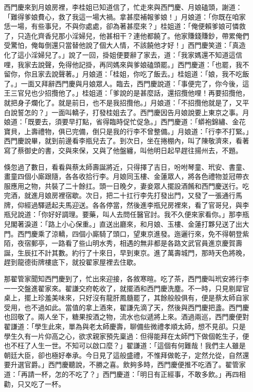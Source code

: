 西門慶來到月娘房裡，李桂姐已知道信了，忙走來與西門慶、月娘磕頭，謝道：「難得爹娘費心，救了我這一場大禍。拿甚麼補報爹娘！」月娘道：「你既在咱家恁一場，有些事兒，不與你處處，卻為著甚麼來？」桂姐道：「俺便賴爹娘可憐救了，只造化齊香兒那小淫婦兒，他甚相干？連他都饒了。他家賺錢賺鈔，帶累俺們受驚怕，俺每倒還只當替他說了個大人情，不該饒他才好！」西門慶笑道：「真造化了這小淫婦兒了。」說了一回，掛姐便要辭了家去，道：「我家媽還不知道這信哩，我家去說聲，免得他記掛，再同媽來與爹娘磕頭罷。」西門慶道：「也罷，我不留你，你且家去說聲著。」月娘道：「桂姐，你吃了飯去。」桂姐道：「娘，我不吃飯了。」一面又拜辭西門慶與月娘眾人。臨去，西門慶說道：「事便完了，你今後，這王三官兒也少招攬他了。」桂姐道：「爹說的是甚麼話，還招攬他哩！再要招攬他，就把身子爛化了。就是前日，也不是我招攬他。」月娘道：「不招攬他就是了，又平白說誓怎的？」一面叫轎子，打發桂姐去了。西門慶因告月娘說要上東京之事。月娘道：「既要去，須要早打點，省得臨時促忙促急。」西門慶道：「蟒袍錦繡、金花寶貝，上壽禮物，俱已完備，倒只是我的行李不曾整備。」月娘道：「行李不打緊。」西門慶說畢，就到前邊看李瓶兒去了。到次日，坐在捲棚內，叫了陳敬濟來，看著寫了蔡御史的書，交與來保，又與了他盤纏，叫他明日起早趕往揚州去，不題。

倏忽過了數日，看看與蔡太師壽誕將近，只得擇了吉日，吩咐琴童、玳安、書童、畫童四個小廝跟隨，各各收拾行李。月娘同玉樓、金蓮眾人，將各色禮物並冠帶衣服應用之物，共裝了二十餘扛。頭一日晚夕，妻妾眾人擺設酒餚和西門慶送行。吃完酒，就進月娘房裡宿歇。次日，把二十扛行李先打發出門，又發了一張通行馬牌，仰經過驛遞起夫馬迎送。各各停當，然後進李瓶兒房裡來，看了官哥兒，與李瓶兒說道：「你好好調理。要藥，叫人去問任醫官討。我不久便來家看你。」那李瓶兒閣著淚道：「路上小心保重。」直送出廳來，和月娘、玉樓、金蓮打夥兒送了出大門。西門慶乘了涼轎，四個小廝騎了頭口，望東京進發。迤邐行來，免不得朝登紫陌，夜宿郵亭，一路看了些山明水秀，相遇的無非都是各路文武官員進京慶賀壽誕，生辰扛不計其數。約行了十來日，早到東京。進了萬壽城門，那時天色將晚，趕到龍德街牌樓底下，就投翟家屋裡去住歇。

那翟管家聞知西門慶到了，忙出來迎接，各敘寒暄。吃了茶，西門慶叫玳安將行李一一交盤進翟家來。翟謙交府乾收了，就擺酒和西門慶洗塵。不一時，只見剔犀官桌上，擺上珍羞美味來，只好沒有龍肝鳳髓罷了，其餘般般俱有，便是蔡太師自家受用，也不過如此。當值的拿上酒來，翟謙先滴了天，然後與西門慶把盞。西門慶也回敬了。兩人坐下，糖果按酒之物，流水也似遞將上來。酒過兩巡，西門慶便對翟謙道：「學生此來，單為與老太師慶壽，聊備些微禮孝順太師，想不見卻。只是學生久有一片仰高之心，欲求親家預先稟過：但得能拜在太師門下做個乾生子，便也不枉了人生一世。不知可以啟口麼？」翟謙道：「這個有何難哉！我們主人雖是朝廷大臣，卻也極好奉承。今日見了這般盛禮，不惟拜做乾子，定然允從，自然還要升選官爵。」西門慶聽說，不勝之喜。飲夠多時，西門慶便推不吃酒了。翟管家道：「再請一杯，怎的不吃了？」西門慶道：「明日有正經事，不敢多飲。」再四相勸，只又吃了一杯。

